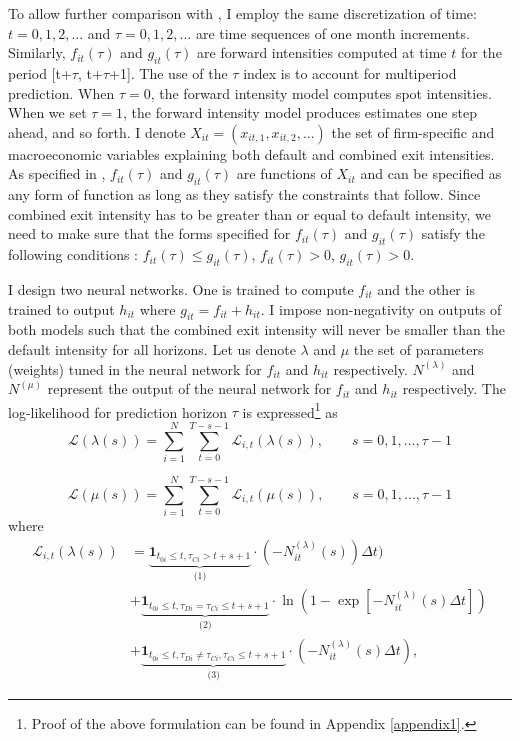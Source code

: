 To allow further comparison with \citet{Duan2012},  I employ the same discretization of time: $t = 0, 1, 2,...$ and $\tau = 0, 1, 2,...$ are time sequences of one month increments. Similarly, $f_{it}(\tau)$ and $g_{it}(\tau)$ are forward intensities computed at time $t$ for the period [t+$\tau$, t+$\tau$+1]. The use of the $\tau$ index is to account for multiperiod prediction. When $\tau = 0$, the forward intensity model computes spot intensities. When we set $\tau = 1$, the forward intensity model produces estimates one step ahead, and so forth. I denote $X_{it} = (x_{it,1}, x_{it,2} ,...)$ the set of firm-specific and macroeconomic variables explaining both default and combined exit intensities. As specified in \citet{Duan2012}, $f_{it}(\tau)$ and $g_{it}(\tau)$ are functions of $X_{it}$ and can be specified as any form of function as long as they satisfy the constraints that follow. Since combined exit intensity has to be greater than or equal to default intensity, we need to make sure that the forms specified for $f_{it}(\tau)$ and $g_{it}(\tau)$ satisfy the following conditions : $f_{it}(\tau) \leq g_{it}(\tau)$, $f_{it}(\tau) > 0$, $g_{it}(\tau) > 0$. 

I design two neural networks. One is trained to compute $f_{it}$ and the other is trained to output $h_{it}$ where $g_{it} = f_{it} + h_{it}$. I impose non-negativity on outputs of both models such that the combined exit intensity will never be smaller than the default intensity for all horizons. Let us denote $\lambda$ and $\mu$ the set of parameters (weights) tuned in the neural network for $f_{it}$ and $h_{it}$ respectively. $N^{(\lambda)}$ and $N^{(\mu)}$ represent the output of the neural network for $f_{it}$ and $h_{it}$ respectively. The log-likelihood for prediction horizon $\tau$ is expressed\footnote{Proof of the above formulation can be found in Appendix \ref{appendix1}.} as
\begin{equation} \label{decomp1}
\mathcal{L}(\lambda(s)) = \sum_{i=1}^N \sum_{t=0}^{T-s-1} \mathcal{L}_{i,t}(\lambda(s)), \qquad s = 0,1,...,\tau-1
\end{equation}

\begin{equation} \label{decomp2}
\mathcal{L}(\mu(s)) = \sum_{i=1}^N \sum_{t=0}^{T-s-1} \mathcal{L}_{i,t}(\mu(s)), \qquad s = 0,1,...,\tau-1
\end{equation}
where 
\begin{align} \label{small_lik_f}
\mathcal{L}_{i,t}(\lambda(s)) &= \underbrace{\textbf{1}_{t_{0i} \leq t,\tau_{Ci} > t + s +1}}_\textrm{(1)} \cdot (-N_{it}^{(\lambda)}(s)) \Delta t)\\ \nonumber
&+ \underbrace{\textbf{1}_{t_{0i} \leq t, \tau_{Di}=\tau_{Ci} \leq t+s+1}}_\textrm{(2)} \cdot \ln(1-\exp[-N_{it}^{(\lambda)}(s)\Delta t]) \\
&+ \underbrace{\textbf{1}_{t_{0i} \leq t, \tau_{Di} \neq \tau_{Ci}, \tau_{Ci} \leq t+s+1}}_\textrm{(3)} \cdot (-N_{it}^{(\lambda)}(s)\Delta t) \nonumber,
\end{align}

